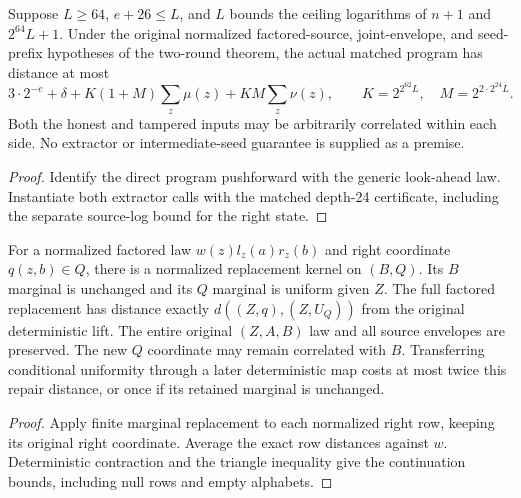 \begin{theorem}
  \label{thm:lowerbounds-algebraic-concrete-lookahead}
  \leanok
  Suppose $L\ge64$, $e+26\le L$, and $L$ bounds the ceiling logarithms
  of $n+1$ and $2^{64}L+1$. Under the original normalized factored-source,
  joint-envelope, and seed-prefix hypotheses of the two-round theorem,
  the actual matched program has distance at most
  \[
    3\cdot2^{-e}+\delta+K(1+M)\sum_z\mu(z)+KM\sum_z\nu(z),
    \qquad K=2^{2^{62}L},\quad M=2^{2\cdot2^{24}L}.
  \]
  Both the honest and tampered inputs may be arbitrarily correlated
  within each side. No extractor or intermediate-seed guarantee is
  supplied as a premise.
\end{theorem}
\begin{proof}
  \leanok
  Identify the direct program pushforward with the generic look-ahead law.
  Instantiate both extractor calls with the matched depth-24 certificate,
  including the separate source-log bound for the right state.
\end{proof}

\begin{theorem}
  \label{thm:lowerbounds-algebraic-factored-repair}
  \leanok
  For a normalized factored law $w(z)l_z(a)r_z(b)$ and right coordinate
  $q(z,b)\in Q$, there is a normalized replacement kernel on $(B,Q)$.
  Its $B$ marginal is unchanged and its $Q$ marginal is uniform given $Z$.
  The full factored replacement has distance exactly
  $d((Z,q),(Z,U_Q))$ from the original deterministic lift.
  The entire original $(Z,A,B)$ law and all source envelopes are preserved.
  The new $Q$ coordinate may remain correlated with $B$.
  Transferring conditional uniformity through a later deterministic map
  costs at most twice this repair distance, or once if its retained
  marginal is unchanged.
\end{theorem}
\begin{proof}
  \leanok
  Apply finite marginal replacement to each normalized right row, keeping
  its original right coordinate. Average the exact row distances against
  $w$. Deterministic contraction and the triangle inequality give the
  continuation bounds, including null rows and empty alphabets.
\end{proof}

